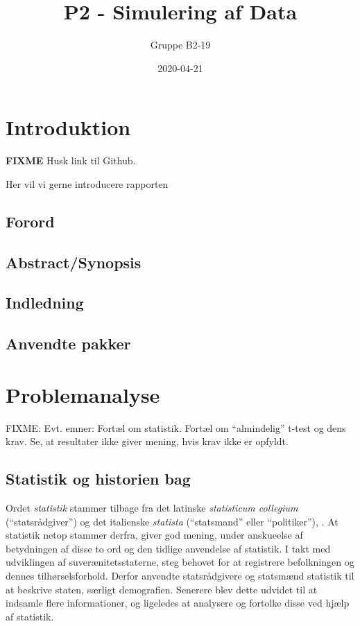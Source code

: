 \documentclass[
]{book}
\title{P2 - Simulering af Data}
\author{Gruppe B2-19}
\date{2020-04-21}
\theoremstyle{definition}
\theoremstyle{definition}
\theoremstyle{definition}
\theoremstyle{remark}
\begin{document}
\maketitle

{
\setcounter{tocdepth}{1}
\tableofcontents
}
\hypertarget{introduktion}{%
\chapter{Introduktion}\label{introduktion}}

\textbf{FIXME} Husk link til Github.

Her vil vi gerne introducere rapporten

\hypertarget{forord}{%
\section{Forord}\label{forord}}

\hypertarget{abstractsynopsis}{%
\section{Abstract/Synopsis}\label{abstractsynopsis}}

\hypertarget{indledning}{%
\section{Indledning}\label{indledning}}

\hypertarget{anvendte-pakker}{%
\section{Anvendte pakker}\label{anvendte-pakker}}

\hypertarget{problemanalyse}{%
\chapter{Problemanalyse}\label{problemanalyse}}

FIXME: Evt. emner: Fortæl om statistik. Fortæl om ``almindelig'' t-test og dens krav. Se, at resultater ikke giver mening, hvis krav ikke er opfyldt.

\hypertarget{statistik-og-historien-bag}{%
\section{Statistik og historien bag}\label{statistik-og-historien-bag}}

Ordet \emph{statistik} stammer tilbage fra det latinske \emph{statisticum collegium} (``statsrådgiver'') og det italienske \emph{statista} (``statsmand'' eller ``politiker''), \citep{Orddef}. At statistik netop stammer derfra, giver god mening, under anskueelse af betydningen af disse to ord og den tidlige anvendelse af statistik. I takt med udviklingen af suverænitetsstaterne, steg behovet for at registrere befolkningen og dennes tilhørselsforhold. Derfor anvendte statsrådgivere og statsmænd statistik til at beskrive staten, særligt demografien. Senerere blev dette udvidet til at indsamle flere informationer, og ligeledes at analysere og fortolke disse ved hjælp af statistik.
\end{document}
